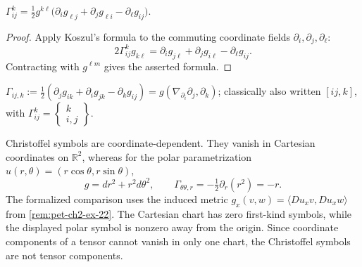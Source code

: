 \begin{proposition}
  \label{prop:pet-ch2-christoffel-formula}


  $\displaystyle\Gamma^k_{ij}=\tfrac12g^{k\ell}\big(\partial_ig_{\ell j}+\partial_jg_{\ell i}-\partial_\ell g_{ij}\big)$.
\end{proposition}
\begin{proof}

  \sketch
  Apply Koszul's formula to the
  commuting coordinate fields $\partial_i,\partial_j,\partial_\ell$:
  \[
    2\Gamma^k_{ij}g_{k\ell}
      =\partial_i g_{j\ell}+\partial_j g_{i\ell}
       -\partial_\ell g_{ij}.
  \]
  Contracting with $g^{\ell m}$ gives the asserted formula.
\end{proof}

\begin{definition}
  \label{def:pet-ch2-christoffel-symbols-first-kind}


  $\Gamma_{ij,k}:=\tfrac12(\partial_jg_{ik}+\partial_ig_{jk}-\partial_kg_{ij})=g(\nabla_{\partial_i}\partial_j,\partial_k)$;
  classically also written $[ij,k]$, with $\Gamma^k_{ij}=\begin{Bmatrix}k\\i,j\end{Bmatrix}$.
\end{definition}

\begin{remark}
  \label{rem:pet-ch2-christoffel-non-tensorial}


  Christoffel symbols are
  coordinate-dependent. They vanish in Cartesian coordinates on
  $\mathbb{R}^2$, whereas for the polar parametrization
  $u(r,\theta)=(r\cos\theta,r\sin\theta)$,
  \[
    g=dr^2+r^2d\theta^2,\qquad
    \Gamma_{\theta\theta,r}=-\tfrac12\partial_r(r^2)=-r.
  \]
  \sketch
  The formalized comparison uses the induced metric
  $g_x(v,w)=\langle Du_xv,Du_xw\rangle$ from
  \cref{rem:pet-ch2-ex-22}. The Cartesian chart has zero first-kind symbols,
  while the displayed polar symbol is nonzero away from the origin. Since
  coordinate components of a tensor cannot vanish in only one chart, the
  Christoffel symbols are not tensor components.
\end{remark}

